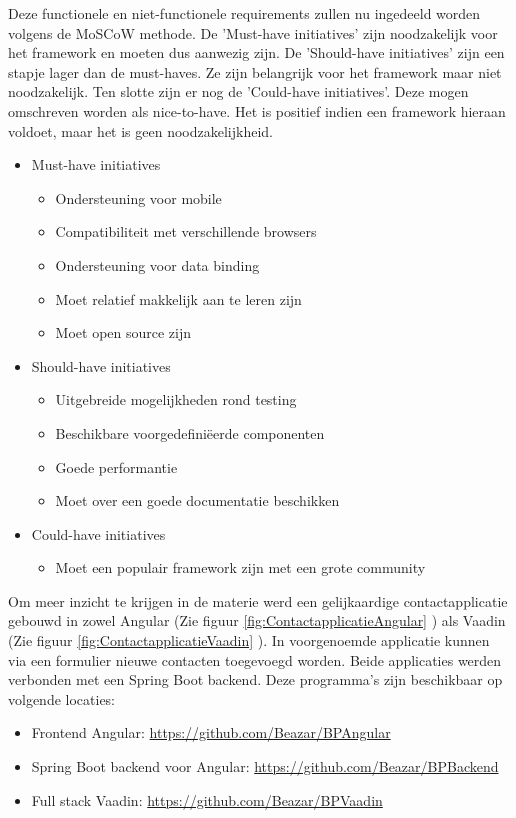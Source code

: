 Deze functionele en niet-functionele requirements zullen nu ingedeeld worden volgens de MoSCoW methode.\autocite{ProductPlan2019}
De 'Must-have initiatives' zijn noodzakelijk voor het framework en moeten dus aanwezig zijn.
De 'Should-have initiatives' zijn een stapje lager dan de must-haves. Ze zijn belangrijk voor het framework maar niet noodzakelijk.
Ten slotte zijn er nog de 'Could-have initiatives'. Deze mogen omschreven worden als nice-to-have. Het is positief indien een framework hieraan voldoet, maar het is geen noodzakelijkheid.

\begin{itemize}
	\item  Must-have initiatives
	\begin{itemize}
	\item Ondersteuning voor mobile
	\item Compatibiliteit met verschillende browsers
	\item Ondersteuning voor data binding
	\item Moet relatief makkelijk aan te leren zijn
	\item Moet open source zijn	 
	\end{itemize}
	\item Should-have initiatives
	\begin{itemize}
	\item Uitgebreide mogelijkheden rond testing
	\item Beschikbare voorgedefiniëerde componenten 
	\item Goede performantie
	\item Moet over een goede documentatie beschikken
	\end{itemize}
		\item Could-have initiatives
		\begin{itemize}
	\item Moet een populair framework zijn met een grote community
		\end{itemize}
\end{itemize}

Om meer inzicht te krijgen in de materie werd een gelijkaardige contactapplicatie gebouwd in zowel Angular (Zie figuur \ref{fig:ContactapplicatieAngular} ) als Vaadin (Zie figuur \ref{fig:ContactapplicatieVaadin} ). In voorgenoemde applicatie kunnen via een formulier nieuwe contacten toegevoegd worden. Beide applicaties werden verbonden met een Spring Boot backend. Deze programma's zijn beschikbaar op volgende locaties:
\begin{itemize}
	\item Frontend Angular: \url{https://github.com/Beazar/BPAngular}
	\item Spring Boot backend voor Angular: \url{https://github.com/Beazar/BPBackend}
	\item Full stack Vaadin: \url{https://github.com/Beazar/BPVaadin}
\end{itemize}

